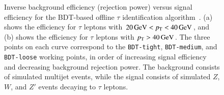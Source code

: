 \begin{figure}[htbp]
	\centering
	\hfill
	\caption{Inverse background efficiency (rejection power) versus signal efficiency for the BDT-based offline $\tau$ identification algorithm~\cite{TheATLASCollaboration:2015be}. (a) shows the efficiency for $\tau$ leptons with $\SI{20}{\giga\electronvolt}<p_{\text{T}}<\SI{40}{\giga\electronvolt}$, and (b) shows the efficiency for $\tau$ leptons with $p_{\text{T}}>\SI{40}{\giga\electronvolt}$. The three points on each curve correspond to the \texttt{BDT-tight}, \texttt{BDT-medium}, and \texttt{BDT-loose} working points, in order of increasing signal efficiency and decreasing background rejection power. The background consists of simulated multijet events, while the signal consists of simulated $Z$, $W$, and $Z'$ events decaying to $\tau$ leptons. }
	\label{fig:reco-tau-efficiency}
\end{figure}

